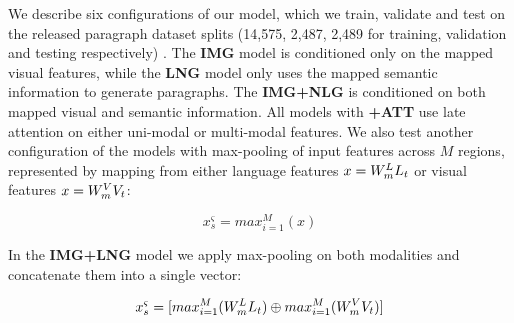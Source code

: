 \documentclass[11pt,a4paper]{article}
\begin{document}
We describe six configurations of our model, which we train, validate and test on the released paragraph dataset splits (14,575, 2,487, 2,489 for training, validation and testing respectively) \cite{krause2016hierarchical}. %
The \textbf{IMG} model is conditioned only on the mapped visual features, while the \textbf{LNG} model only uses the mapped semantic information to generate paragraphs.
The \textbf{IMG+NLG} is conditioned on both mapped visual and semantic information.
All models with \textbf{+ATT} use late attention on either uni-modal or multi-modal features. %
We also test another configuration of the models with max-pooling of input features across $M$ regions, represented by mapping from either language features $x=W_{m}\sp{L} L_t$ or visual features $x=W_{m}\sp{V} V_t$:

\begin{equation}
  x^\varsigma_s = max_{i=1}^M(x)
  \label{eqn:maxpool}
\end{equation}

\noindent In the \textbf{IMG+LNG} model we apply max-pooling on both modalities and concatenate them into a single vector:

\begin{equation}
  x^\varsigma_s = [max_{i=1}^M(W_{m}\sp{L} L_t) \oplus max_{i=1}^M(W_{m}\sp{V} V_t)]
  \label{eqn:maxpool}
\end{equation}



\iffalse
\end{document}
